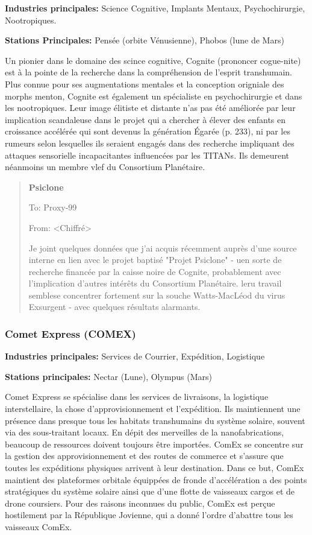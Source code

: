 \textbf{Industries principales:} Science Cognitive, Implants Mentaux, Psychochirurgie, Nootropiques. 

\textbf{Stations Principales:} Pensée (orbite Vénusienne), Phobos (lune de Mars) 

Un pionier dans le domaine des scince cognitive, Cognite (prononcer cogue-nite) est à la pointe de la recherche dans la compréhension de l'esprit transhumain. Plus connue pour ses augmentations mentales et la conception origniale des morphs menton, Cognite est également un spécialiste en psychochirurgie et dans les nootropiques. Leur image élitiste et distante n'as pas été améliorée par leur implication scandaleuse dans le projet qui a chercher à élever des enfants en croissance accélérée qui sont devenus la génération Égarée (p. 233), ni par les rumeurs selon lesquelles ils seraient engagés dans des recherche impliquant des attaques sensorielle incapacitantes influencées par les TITANs. Ils demeurent néanmoins un membre vlef du Consortium Planétaire. 

\begin{quotation} \textbf{Psiclone} 

To: Proxy-99 

From: <Chiffré> 

Je joint quelques données que j'ai acquis récemment auprès d'une source interne en lien avec le projet baptisé "Projet Psiclone" - uen sorte de recherche financée par la caisse noire de Cognite, probablement avec l'implication d'autres intérêts du Consortium Planétaire. leru travail semblese concentrer fortement sur la souche Watts-MacLéod du virus Exsurgent - avec quelques résultats alarmants. \end{quotation} 

\subsubsection{Comet Express (COMEX)} \label{sec:comet-express-comex} 

\textbf{Industries principales:} Services de Courrier, Expédition, Logistique 

\textbf{Stations principales:} Nectar (Lune), Olympus (Mars) 

Comet Express se spécialise dans les services de livraisons, la logistique interstellaire, la chose d'approvisionnement et l'expédition. Ils maintiennent une présence dans presque tous les habitats transhumains du système solaire, souvent via des sous-traitant locaux. En dépit des merveilles de la nanofabrications, beaucoup de ressources doivent toujours être importées. ComEx se concentre sur la gestion des approvisionnement et des routes de commerce et s'assure que toutes les expéditions physiques arrivent à leur destination. Dans ce but, ComEx maintient des plateformes orbitale équippées de fronde d'accélération a des points stratégiques du système solaire ainsi que d'une flotte de vaisseaux cargos et de drone coursiers. Pour des raisons inconnues du public, ComEx est perçue hostilement par la République Jovienne, qui a donné l'ordre d'abattre tous les vaisseaux ComEx. 

